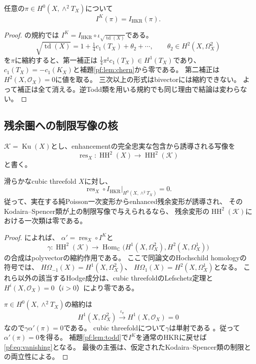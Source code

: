 \begin{lemma}
\label{pf:lem:todd}
任意の$\pi\in H^0(X,\wedge^2T_X)$について
\[
 I^K(\pi)=I_{\mathrm{HKR}}(\pi).
\]
\end{lemma}
\begin{proof}
\cite[Theorem 1.4]{PFCRVdB}の規約では
$I^K=I_{\mathrm{HKR}}\circ\iota_{\sqrt{\operatorname{td}(X)}}$である。
\[
 \sqrt{\operatorname{td}(X)}
 =1+\tfrac14c_1(T_X)+\theta_2+\cdots,
 \qquad\theta_2\in H^2(X,\Omega_X^2)
\]
を$\pi$に縮約すると、第一補正は
$\tfrac14\pi^\sharp c_1(T_X)\in H^1(T_X)$であり、
$c_1(T_X)=-c_1(K_X)$と補題\ref{pf:lem:chern}から零である。
第二補正は$H^2(X,\mathcal O_X)=0$に値を取る。
三次以上の形式はbivectorには縮約できない。
よって補正は全て消える。逆Todd類を用いる規約でも同じ理由で結論は変わらない。
\end{proof}

\subsection{残余圏への制限写像の核}
$\mathcal K=\operatorname{Ku}(X)$とし、enhancementの完全忠実な包含から誘導される写像を
\[
 \operatorname{res}_X:\operatorname{HH}^2(X)\longrightarrow\operatorname{HH}^2(\mathcal K)
\]
と書く。

\begin{proposition}[Poisson方向の一次消滅]
\label{pf:prop:vanishing}
滑らかなcubic threefold $X$に対し、
\[
 \operatorname{res}_X\circ I_{\mathrm{HKR}}
 \big|_{H^0(X,\wedge^2T_X)}=0.
 \tag{PV}\label{pf:eq:vanishing}
\]
従って、実在する純Poisson一次変形からenhanced残余変形が誘導され、
そのKodaira--Spencer類が上の制限写像で与えられるなら、
残余変形の$\operatorname{HH}^2(\mathcal K)$における一次類は零である。
\end{proposition}
\begin{proof}
\cite[Theorem 3.10]{JLLZ}によれば、
$\alpha'=\operatorname{res}_X\circ I^K$と
\[
 \gamma:\operatorname{HH}^2(\mathcal K)\longrightarrow
 \operatorname{Hom}_{\mathbb C}
 \bigl(H^1(X,\Omega_X^2),H^2(X,\Omega_X^1)\bigr)
\]
の合成はpolyvectorの縮約作用である。
ここで同論文のHochschild homologyの符号では、
$H\Omega_{-1}(X)=H^1(X,\Omega_X^2)$、
$H\Omega_1(X)=H^2(X,\Omega_X^1)$となる。
これら以外の該当するHodge成分は、cubic threefoldのLefschetz定理と
$H^i(X,\mathcal O_X)=0$（$i>0$）により零である。

$\pi\in H^0(X,\wedge^2T_X)$の縮約は
\[
 H^1(X,\Omega_X^2)\xrightarrow{\ \iota_\pi\ }
 H^1(X,\mathcal O_X)=0
\]
なので$\gamma\alpha'(\pi)=0$である。
cubic threefoldについて$\gamma$は単射である
\cite[Theorem 4.4(2)]{JLLZ}。従って$\alpha'(\pi)=0$を得る。
補題\ref{pf:lem:todd}で$I^K$を通常のHKRに戻せば
\eqref{pf:eq:vanishing}となる。
最後の主張は、仮定されたKodaira--Spencer類の制限との両立性による。
\end{proof}

